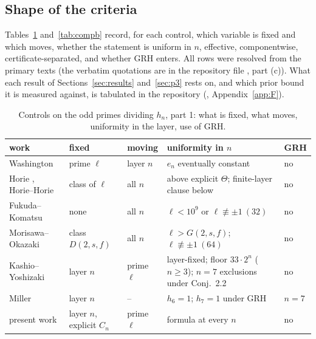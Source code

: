\documentclass[11pt]{amsart}
\theoremstyle{remark}\newtheorem{remark}[theorem]{Remark}
\theoremstyle{definition}\newtheorem{definition}[theorem]{Definition}
\begin{document}
\subsection{Shape of the criteria}
Tables~\ref{tab:comp} and~\ref{tab:compb} record, for each control, which variable is fixed and which moves, whether the statement is uniform in $n$, effective, componentwise, certificate-separated, and whether GRH enters. All rows were resolved from the primary texts (the verbatim quotations are in the repository file , part (c)). What each result of Sections~\ref{sec:results} and~\ref{sec:p3} rests on, and which prior bound it is measured against, is tabulated in the repository (\artNovelty{}, Appendix~\ref{app:F}).
\begin{table}[h]\footnotesize
\begin{tabular}{@{}p{3.0cm}p{1.7cm}p{1.5cm}p{3.6cm}p{1.1cm}@{}}\toprule
work & fixed & moving & uniformity in $n$ & GRH\\ \midrule
Washington \cite{Wa75,Wa78} & prime $\ell$ & layer $n$ & $e_n$ eventually constant & no\\
Horie \cite{Ho05,Ho07}, Horie--Horie \cite{HH09} & class of $\ell$ & all $n$ & above explicit $\Theta$; finite-layer clause below & no\\
Fukuda--Komatsu \cite{FK3} & none & all $n$ & $\ell<10^9$ or $\ell\not\equiv\pm1\ (32)$ & no\\
Morisawa--Okazaki \cite{MO16} & class $D(2,s,f)$ & all $n$ & $\ell>G(2,s,f)$; $\ell\not\equiv\pm1\ (64)$ & no\\
Kashio--Yoshizaki \cite{KY} & layer $n$ & prime $\ell$ & layer-fixed; floor $33\cdot2^n$ ($n\ge3$); $n=7$ exclusions under Conj.~2.2 & no\\
Miller \cite{Mi} & layer $n$ & -- & $h_6=1$; $h_7=1$ under GRH & $n=7$\\
present work & layer $n$, explicit $C_n$ & prime $\ell$ & formula at every $n$ & no\\
\bottomrule\end{tabular}
\caption{Controls on the odd primes dividing $h_n$, part 1: what is fixed, what moves, uniformity in the layer, use of GRH.}\label{tab:comp}
\end{table}
\end{document}
